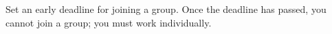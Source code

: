 \documentclass{article}
\begin{document}
Set an early deadline for joining a group. Once the deadline has passed, you cannot join a group; you must work individually.
\end{document}
